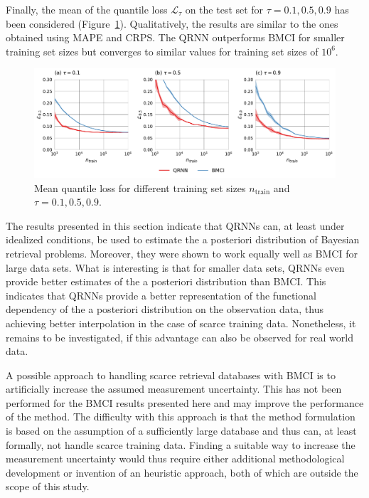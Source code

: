 \documentclass[journal abbreviation, manuscript]{copernicus}
\begin{document}
Finally, the mean of the quantile loss $\mathcal{L}_\tau$ on the test set for
$\tau = 0.1, 0.5, 0.9$ has been considered (Figure~\ref{fig:quantile_losses}).
Qualitatively, the results are similar to the ones obtained using MAPE and CRPS.
The QRNN outperforms BMCI for smaller training set sizes but converges to similar
 values for training set sizes of $10^6$.

  \begin{figure}[hbpt!]
    \centering
    \includegraphics[width = 0.8\linewidth]{../plots/fig07}
    \caption{Mean quantile loss for different training set sizes $n_\text{train}$ and
    $\tau = 0.1, 0.5, 0.9$.}
    \label{fig:quantile_losses}
  \end{figure}

The results presented in this section indicate that QRNNs can, at least
under idealized conditions, be used to estimate the a posteriori distribution of 
Bayesian retrieval problems. Moreover, they were shown to work equally well
as BMCI for large data sets. What is interesting is that for smaller data sets,
QRNNs even provide better estimates of the a posteriori distribution than BMCI.
This indicates that QRNNs provide a better representation of the functional
dependency of the a posteriori distribution on the observation data, thus
achieving better interpolation in the case of scarce training data. Nonetheless,
 it remains to be investigated, if this advantage can also be observed for real
world data.

A possible approach to handling scarce retrieval databases with BMCI is to
artificially increase the assumed measurement uncertainty. This has not been
performed for the BMCI results presented here and may improve the performance of
the method. The difficulty with this approach is that the method formulation
is based on the assumption of a sufficiently large database and thus can,
at least formally, not handle scarce training data. Finding a suitable way to
increase the measurement uncertainty would thus require either additional
methodological development or invention of an heuristic approach, both of which
are outside the scope of this study.
\end{document}

